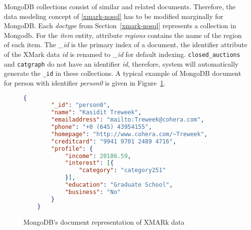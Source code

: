 MongoDB collections consist of  similar and related documents. Therefore, the data modeling concept of \ref{xmark-nosql} has to be modified marginally for MongoDB. Each \textit{doctype} from Section~\ref{xmark-nosql} represents a collection in Mongodb. For the \textit{item} entity,  attribute \textit{regions} contains the name of the region of each item. The \textit{\_id} is the primary index of a document, 
the identifier attribute of the XMark data \textit{id} is renamed to \textit{\_id} for default indexing.  \texttt{closed\_auctions} and \texttt{catgraph} do not have an identifier \textit{id}, therefore, system will automatically generate the \texttt{\_id} in these collections. A typical example of MongoDB document for person with identifier \textit{person0} is given in Figure~\ref{code:mongodb-person0}.	
\begin{figure}
\begin{lstlisting}[language=JSON, basicstyle =\scriptsize]
	{
		"_id": "person0",
		"name": "Kasidit Treweek",
		"emailaddress": "mailto:Treweek@cohera.com",
		"phone": "+0 (645) 43954155",
		"homepage": "http://www.cohera.com/~Treweek",
		"creditcard": "9941 9701 2489 4716",
		"profile": {
			"income": 20186.59,
			"interest": [{
				"category": "category251"
			}],
			"education": "Graduate School",
			"business": "No"
		}
	}
\end{lstlisting}
\caption{MongoDB's document representation of XMARk data}
\label{code:mongodb-person0}
\end{figure}
